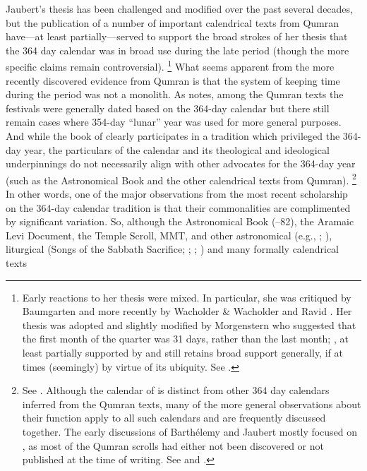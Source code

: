 Jaubert's thesis has been challenged and modified over the past several decades, but the publication of a number of important calendrical texts from Qumran have---at least partially---served to support the broad strokes of her thesis that the 364 day calendar was in broad use during the late \secondtemple period (though the more specific claims remain controversial).%
    \footnote{Early reactions to her thesis were mixed. In particular, she was critiqued by Baumgarten 
    \autocite*{baumgarten_baumgarten1977} and more recently by Wacholder \& Wacholder 
    \autocite*{wacholder-wacholder_huca1995} and Ravid 
    \autocite*{ravid_dsd2003}. Her thesis was adopted and slightly modified by Morgenstern who suggested that the first month of the quarter was 31 days, rather than the last month; 
    \autocite*{morgenstern_vt1955}, at least partially supported by \vanderkam 
    \autocite*[410--411]{vanderkam_cbq1979} and still retains broad support generally, if at times (seemingly) by virtue of its ubiquity. See 
    \cite[142]{bendov-saulnier_cbr2008}.}
What seems apparent from the more recently discovered evidence from Qumran is that the system of keeping time during the \secondtemple period was not a monolith. As \vanderkam notes, among the Qumran texts the festivals were generally dated based on the 364-day calendar but there still remain cases where 354-day ``lunar'' year was used for more general purposes.\autocite[1:45]{vanderkam2018} And while the book of \jub clearly participates in a tradition which privileged the 364-day year, the particulars of the \jub calendar and its theological and ideological underpinnings do not necessarily align with other advocates for the 364-day year (such as the Astronomical Book and the other calendrical texts from Qumran).%
    \footnote{See \cite[,159]{bendov-saulnier_cbr2008}. Although the calendar of \jub is distinct from other 364 day calendars inferred from the Qumran texts, many of the more general observations about their function apply to all such calendars and are frequently discussed together. The early discussions of Barthélemy and Jaubert mostly focused on \jub, as most of the Qumran scrolls had either not been discovered or not published at the time of writing. See \cite{barthelemy_rb1952} and \cite{jaubert_vt1957}.}
In other words, one of the major observations from the most recent scholarship on the 364-day calendar tradition is that their commonalities are complimented by significant variation. So, although the Astronomical Book (--82), the Aramaic Levi Document, the Temple Scroll, MMT,  and other astronomical (e.g., ; ), liturgical (Songs of the Sabbath Sacrifice; ; ; ) and many formally calendrical texts%

